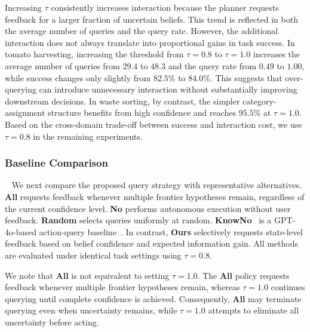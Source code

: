 Increasing $\tau$ consistently increases interaction because the planner requests feedback for a larger fraction of uncertain beliefs. This trend is reflected in both the average number of queries and the query rate. However, the additional interaction does not always translate into proportional gains in task success. In tomato harvesting, increasing the threshold from $\tau=0.8$ to $\tau=1.0$ increases the average number of queries from $29.4$ to $48.3$ and the query rate from $0.49$ to $1.00$, while success changes only slightly from $82.5\%$ to $84.0\%$. This suggests that over-querying can introduce unnecessary interaction without substantially improving downstream decisions. In waste sorting, by contrast, the simpler category-assignment structure benefits from high confidence and reaches $95.5\%$ at $\tau=1.0$. Based on the cross-domain trade-off between success and interaction cost, we use $\tau=0.8$ in the remaining experiments.



\subsubsection{Baseline Comparison}~\label{exp:sys_baseline}
We next compare the proposed query strategy with representative alternatives. \textbf{All} requests feedback whenever multiple frontier hypotheses remain, regardless of the current confidence level. \textbf{No} performs autonomous execution without user feedback. \textbf{Random} selects queries uniformly at random. \textbf{KnowNo}~\cite{ren2023robots} is a GPT-4o-based action-query baseline~\cite{achiam2023gpt}. In contrast, \textbf{Ours} selectively requests state-level feedback based on belief confidence and expected information gain. All methods are evaluated under identical task settings using $\tau=0.8$.


We note that \textbf{All} is not equivalent to setting $\tau=1.0$. The \textbf{All} policy requests feedback whenever multiple frontier hypotheses remain, whereas $\tau=1.0$ continues querying until complete confidence is achieved. Consequently, \textbf{All} may terminate querying even when uncertainty remains, while $\tau=1.0$ attempts to eliminate all uncertainty before acting.


